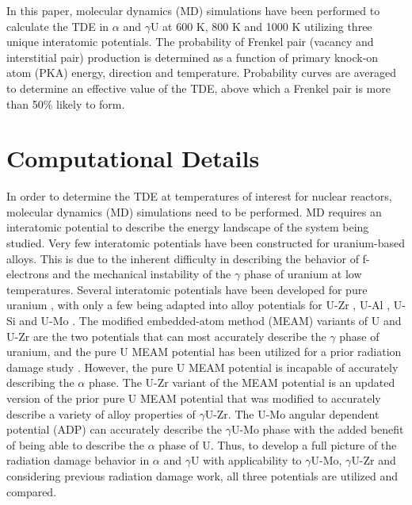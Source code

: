 \documentclass[review]{elsarticle}
\providecommand{\DIFaddtex}[1]{{\protect\color{blue} \sf #1}} %
\providecommand{\DIFaddbegin}{} %
\providecommand{\DIFaddend}{} %
\providecommand{\DIFadd}[1]{\texorpdfstring{\DIFaddtex{#1}}{#1}} %
\newcommand{\DIFaddincludegraphics}[2][]{{\color{blue}\fbox{\DIFOincludegraphics[#1]{#2}}}} %
\DeclareRobustCommand{\DIFaddbegin}{\DIFOaddbegin \let\includegraphics\DIFaddincludegraphics} %
\DeclareRobustCommand{\DIFaddend}{\DIFOaddend \let\includegraphics\DIFOincludegraphics} %
\begin{document}
In this paper, molecular dynamics (MD) simulations have been performed to calculate the TDE in $\alpha$ and $\gamma$U at 600 K, 800 K and 1000 K utilizing three unique interatomic potentials. The probability of Frenkel pair (vacancy and interstitial pair) production is determined as a function of primary knock-on atom (PKA) \DIFaddbegin \DIFadd{energy, }\DIFaddend direction and temperature. Probability curves are averaged to determine an effective value of the TDE, above which a Frenkel pair is more than 50$\%$ likely to form. 

\section{Computational Details}
In order to determine the TDE at temperatures of interest for nuclear reactors, molecular dynamics (MD) \cite{abraham1986, allen1987} simulations need to be performed. MD requires an interatomic potential to describe the energy landscape of the system being studied. Very few interatomic potentials have been constructed for uranium-based alloys. This is due to the inherent difficulty in describing the behavior of f-electrons and the mechanical instability of the $\gamma$ phase of uranium at low temperatures. Several interatomic potentials have been developed for pure uranium \cite{beeler_meam, beelerASTM, fernandez2014, li2011, smirnova2012, li2012}, with only a few being adapted into alloy potentials for U-Zr \cite{moore2015}, U-Al \cite{pascuet2012}, U-Si \cite{beelerUSi} and U-Mo \cite{smirnovaUMo}. The modified embedded-atom method (MEAM) variants of U and U-Zr \cite{beeler_meam, moore2015} are the two potentials that can most accurately describe the $\gamma$ phase of uranium, and the pure U MEAM potential \cite{beeler_meam} has been utilized for a prior radiation damage study \cite{miao2015}. However, the pure U MEAM potential is incapable of accurately describing the $\alpha$ phase. The U-Zr variant of the MEAM potential is an updated version of the prior pure U MEAM potential that was modified to accurately describe a variety of alloy properties of $\gamma$U-Zr. The U-Mo angular dependent potential (ADP) \cite{smirnovaADP} can accurately describe the $\gamma$U-Mo phase with the added benefit of being able to describe the $\alpha$ phase of U. Thus, to develop a full picture of the radiation damage behavior in $\alpha$ and $\gamma$U with applicability to $\gamma$U-Mo, $\gamma$U-Zr and considering previous radiation damage work, all three potentials are utilized and compared. 
\end{document}
